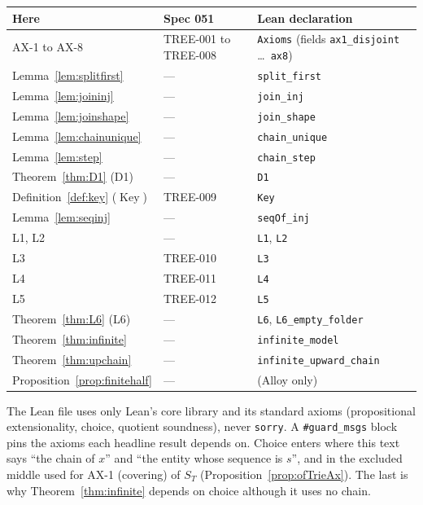 \documentclass[11pt,a4paper]{article}
\newcommand{\Key}{\operatorname{Key}}
\newcommand{\lean}[1]{\texttt{\small #1}}
\theoremstyle{plain}
\theoremstyle{definition}
\theoremstyle{remark}
\begin{document}
\begin{center}
\small
\begin{tabular}{@{}lll@{}}
\toprule
Here & Spec 051 & Lean declaration \\
\midrule
AX-1 to AX-8 & TREE-001 to TREE-008 & \lean{Axioms} (fields \lean{ax1\_disjoint} \dots\ \lean{ax8}) \\
Lemma~\ref{lem:splitfirst} & --- & \lean{split\_first} \\
Lemma~\ref{lem:joininj} & --- & \lean{join\_inj} \\
Lemma~\ref{lem:joinshape} & --- & \lean{join\_shape} \\
Lemma~\ref{lem:chainunique} & --- & \lean{chain\_unique} \\
Lemma~\ref{lem:step} & --- & \lean{chain\_step} \\
Theorem~\ref{thm:D1} (D1) & --- & \lean{D1} \\
Definition~\ref{def:key} ($\Key$) & TREE-009 & \lean{Key} \\
Lemma~\ref{lem:seqinj} & --- & \lean{seqOf\_inj} \\
L1, L2 & --- & \lean{L1}, \lean{L2} \\
L3 & TREE-010 & \lean{L3} \\
L4 & TREE-011 & \lean{L4} \\
L5 & TREE-012 & \lean{L5} \\
Theorem~\ref{thm:L6} (L6) & --- & \lean{L6}, \lean{L6\_empty\_folder} \\
Theorem~\ref{thm:infinite} & --- & \lean{infinite\_model} \\
Theorem~\ref{thm:upchain} & --- & \lean{infinite\_upward\_chain} \\
Proposition~\ref{prop:finitehalf} & --- & (Alloy only) \\
\bottomrule
\end{tabular}
\end{center}

The Lean file uses only Lean's core library and its standard axioms
(propositional extensionality, choice, quotient soundness), never
\lean{sorry}. A \lean{\#guard\_msgs} block pins the axioms each headline result
depends on. Choice enters where this text says ``the chain of $x$'' and
``the entity whose sequence is $s$'', and in the excluded middle used for
AX-1 (covering) of $S_T$ (Proposition~\ref{prop:ofTrieAx}). The last is why
Theorem~\ref{thm:infinite} depends on choice although it uses no chain.
\end{document}

